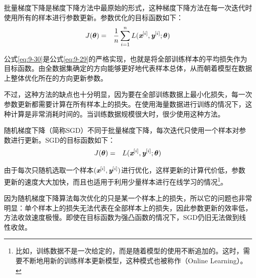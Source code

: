 \vspace{0.5em}
\vspace{0.5em}

\parinterval 批量梯度下降是梯度下降方法中最原始的形式，这种梯度下降方法在每一次迭代时使用所有的样本进行参数更新。参数优化的目标函数如下：
\begin{eqnarray}
J({\bm \theta})&=&\frac{1}{n}\sum_{i=1}^{n}{L({\textbf{\em x}}^{[i]},{\textbf{\em y}}^{[i]};{\bm \theta})}
\label{eq:9-30}
\end{eqnarray}

\parinterval 公式\eqref{eq:9-30}是公式\eqref{eq:9-29}的严格实现，也就是将全部训练样本的平均损失作为目标函数。由全数据集确定的方向能够更好地代表样本总体，从而朝着模型在数据上整体优化所在的方向更新参数。

\parinterval 不过，这种方法的缺点也十分明显，因为要在全部训练数据上最小化损失，每一次参数更新都需要计算在所有样本上的损失。在使用海量数据进行训练的情况下，这种计算是非常消耗时间的。当训练数据规模很大时，很少使用这种方法。

%

\vspace{0.5em}
\vspace{0.5em}

\parinterval 随机梯度下降（简称SGD）不同于批量梯度下降，每次迭代只使用一个样本对参数进行更新。SGD的目标函数如下：
\begin{eqnarray}
J({\bm \theta})&=&L({\textbf{\em x}}^{[i]},{\textbf{\em y}}^{[i]};{\bm \theta})
\label{eq:9-31}
\end{eqnarray}

\noindent 由于每次只随机选取一个样本$({\textbf{\em x}}^{[i]},{\textbf{\em y}}^{[i]})$进行优化，这样更新的计算代价低，参数更新的速度大大加快，而且也适用于利用少量样本进行在线学习的情况\footnote{比如，训练数据不是一次给定的，而是随着模型的使用不断追加的。这时，需要不断地用新的训练样本更新模型，这种模式也被称作{\scriptsize{}}（Online Learning）。}。

\parinterval 因为随机梯度下降算法每次优化的只是某一个样本上的损失，所以它的问题也非常明显：单个样本上的损失无法代表在全部样本上的损失，因此参数更新的效率低，方法收敛速度极慢。即使在目标函数为强凸函数的情况下，SGD仍旧无法做到线性收敛。

